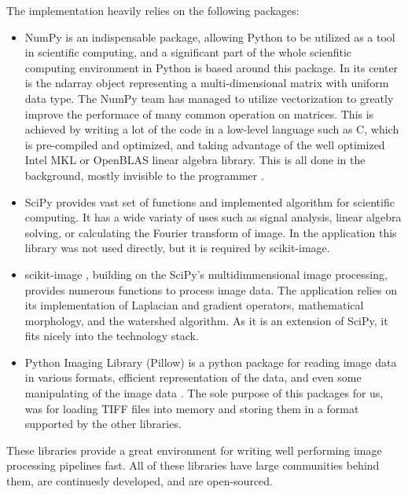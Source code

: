 \documentclass[
  digital,     %
  oneside,     %
  nosansbold,  %
  nocolorbold, %
  lof,         %
  lot,         %
]{fithesis4}
\begin{document}
The implementation heavily relies on the following packages:
\begin{itemize}
    \item{NumPy \cite{harris2020array} is an indispensable package, allowing
        Python to be utilized as a tool in scientific computing, and a
        significant part of the whole scienfitic computing environment in Python
        is based around this package. In its center is the ndarray object
        representing a multi-dimensional matrix with uniform data type. The
        NumPy team has managed to utilize vectorization to greatly improve the
        performace of many common operation on matrices. This is achieved by
        writing a lot of the code in a low-level language such as C, which is
        pre-compiled and optimized, and taking advantage of the well optimized
        Intel MKL or OpenBLAS linear algebra library. This is all done in the
        background, mostly invisible to the programmer \cite{numpyManual2022}.}
    \item{SciPy \cite{2020SciPy-NMeth} provides vast set of functions and
        implemented algorithm for scientific computing. It has a wide variaty of
        uses such as signal analysis, linear algebra solving, or calculating the
        Fourier transform of image. In the application this library was not used
        directly, but it is required by scikit-image.}
    \item{scikit-image \cite{scikit-image}, building on the SciPy's
        multidimmensional image processing, provides numerous functions to
        process image data. The application relies on its implementation of
        Laplacian and gradient operators, mathematical morphology, and the watershed
        algorithm. As it is an extension of SciPy, it fits nicely into the
        technology stack.}
    \item{Python Imaging Library (Pillow) is a python package for reading image
        data in various formats, efficient representation of the data, and even
        some manipulating of the image data \cite{clarkc20102023}. The sole
        purpose of this packages for us, was for loading TIFF files into memory
        and storing them in a format supported by the other libraries.}
\end{itemize}
These libraries provide a great environment for writing well performing image
processing pipelines fast. All of these libraries have large communities
behind them, are continuesly developed, and are open-sourced.
\end{document}
